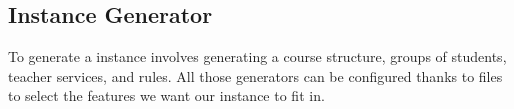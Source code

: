 
%
%

\subsection{Instance Generator}

To generate a \UTP{} instance %
involves generating a course structure,
groups of students, 
teacher services, 
and rules.
All those generators can be configured thanks to \XML{} files to select the features we want our instance to fit in.



